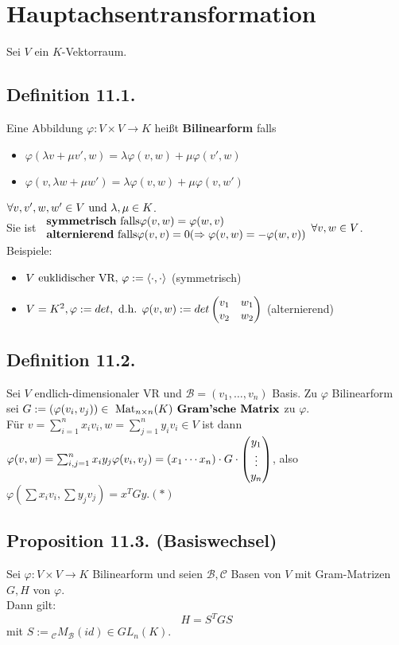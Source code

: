 \documentclass[a4paper, 12pt]{extarticle}
\newcommand{\twoXtwo}[4] {
	\left( 
	\begin{matrix}
		#1 & #2 \\
		#3 & #4
	\end{matrix} 
	\right)
}
\newcommand{\vecThree}[3] {
	\left( 
	\begin{matrix}
		#1\\
		#2\\
		#3
	\end{matrix} 
	\right)
}
\newcommand{\skalar}[2] {
	\langle #1, #2\rangle
}
\newcommand{\genskalar}{
	\skalar{\cdot }{\cdot }
}
\newcommand{\tn}[1]{\textnormal {#1}}
\begin{document}
\section{Hauptachsentransformation}
Sei $V$ ein $K$-Vektorraum.
\subsection*{Definition 11.1.}
Eine Abbildung $\varphi :V\times V \longrightarrow K$ heißt \textbf{Bilinearform} falls
\begin{itemize}
	\item $\varphi(\lambda v + \mu v', w) = \lambda \varphi(v, w) + \mu \varphi(v', w)$
	\item $\varphi(v, \lambda w + \mu w') = \lambda \varphi(v, w) + \mu \varphi(v, w')$
\end{itemize}
$\forall v, v', w, w' \in V \tn{ und } \lambda, \mu \in K$.\\
Sie ist $\begin{array}{ll}\tn{\textbf{symmetrisch} falls} \varphi(v, w) = \varphi(w, v)\\
	\tn{\textbf{alternierend} falls} \varphi(v, v) = 0 (\Rightarrow \varphi(v, w) = -\varphi(w, v))
\end{array} \forall v, w \in V$.\newpage
Beispiele:
\begin{itemize}
	\item $V \tn{ euklidischer VR, } \varphi := \genskalar$ (symmetrisch)
	\item $V = K^2, \varphi := det, \tn{ d.h. } \varphi (v, w) := det \twoXtwo{v_1}{w_1}{v_2}{w_2}$ (alternierend)
\end{itemize}
\subsection*{Definition 11.2.}
Sei $V$ endlich-dimensionaler VR und $\mathcal{B} = (v_1, \dots, v_n)$ Basis. Zu $\varphi$ Bilinearform sei $G := (\varphi(v_i, v_j)) \in \tn{ Mat}_{n \times n}(K) \tn{\textbf{ Gram'sche Matrix}}$ zu $\varphi$.\\
Für $v = \sum_{i=1}^{n}x_iv_i, w = \sum_{j=1}^{n}y_iv_i \in V$ ist dann $\varphi(v, w) = \sum_{i, j = 1}^{n}x_iy_j\varphi(v_i, v_j) =\\ (x_1 \cdots x_n) \cdot G \cdot \vecThree{y_1}{\vdots}{y_n}$, also $\varphi(\sum x_iv_i, \sum y_jv_j) = x^TGy. (\ast)$
\subsection*{Proposition 11.3. (Basiswechsel)}
Sei $\varphi : V\times V \longrightarrow K$ Bilinearform und seien $\mathcal{B}, \mathcal{C}$ Basen von $V$ mit Gram-Matrizen $G, H$ von $\varphi$.\\
Dann gilt:
$$H = S^TGS$$ mit $S := {_\mathcal{C}}M_{\mathcal{B}}(id) \in GL_n(K).$
\end{document}
